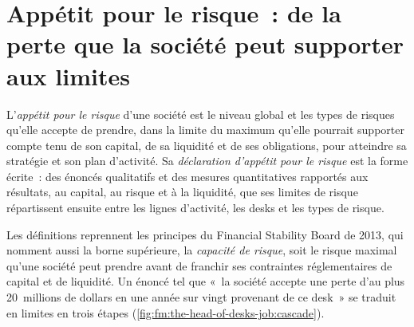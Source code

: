 \section{Appétit pour le risque~: de la perte que la société peut supporter aux limites}

\begin{definition}\label{def:fm:the-head-of-desks-job:appetite}
L'\emph{appétit pour le risque} d'une société est le niveau global et les types de risques qu'elle accepte de prendre, dans la limite du maximum qu'elle pourrait
supporter compte tenu de son capital, de sa liquidité et de ses obligations, pour atteindre sa stratégie et son plan d'activité. Sa \emph{déclaration d'appétit
pour le risque} est la forme écrite~: des énoncés qualitatifs et des mesures quantitatives rapportés aux résultats,
au capital, au risque et à la liquidité, que ses limites de risque répartissent ensuite entre les lignes d'activité, les desks et les types de risque.
\end{definition}

Les définitions reprennent les principes du Financial Stability Board de 2013, qui nomment aussi la borne supérieure, la \emph{capacité de risque}, soit le
risque maximal qu'une société peut prendre avant de franchir ses contraintes réglementaires de capital et de liquidité. Un énoncé tel que «~la société accepte une perte d'au plus
20~millions de dollars en une année sur vingt provenant de ce desk~» se traduit en limites en trois étapes (\cref{fig:fm:the-head-of-desks-job:cascade}).

